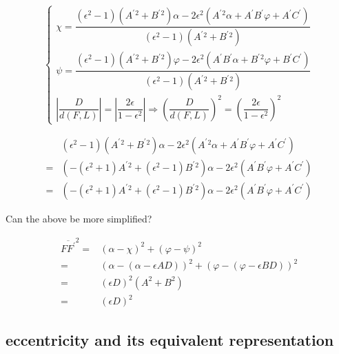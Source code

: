 \documentclass[
]{book}
\theoremstyle{definition}
\theoremstyle{definition}
\theoremstyle{definition}
\theoremstyle{definition}
\theoremstyle{remark}
\begin{document}
\[
\begin{cases}
\chi=\dfrac{\left(\epsilon^{2}-1\right)\left(A^{\prime}{}^{2}+B^{\prime}{}^{2}\right)\alpha-2\epsilon^{2}\left(A^{\prime}{}^{2}\alpha+A^{\prime}B^{\prime}\varphi+A^{\prime}C^{\prime}\right)}{\left(\epsilon^{2}-1\right)\left(A^{\prime}{}^{2}+B^{\prime}{}^{2}\right)}\\
\psi=\dfrac{\left(\epsilon^{2}-1\right)\left(A^{\prime}{}^{2}+B^{\prime}{}^{2}\right)\varphi-2\epsilon^{2}\left(A^{\prime}B^{\prime}\alpha+B^{\prime}{}^{2}\varphi+B^{\prime}C^{\prime}\right)}{\left(\epsilon^{2}-1\right)\left(A^{\prime}{}^{2}+B^{\prime}{}^{2}\right)}\\
\left|\dfrac{D}{d\left(F,L\right)}\right|=\left|\dfrac{2\epsilon}{1-\epsilon^{2}}\right|\Rightarrow\left(\dfrac{D}{d\left(F,L\right)}\right)^{2}=\left(\dfrac{2\epsilon}{1-\epsilon^{2}}\right)^{2}
\end{cases}
\]

\[
\begin{aligned}
 & \left(\epsilon^{2}-1\right)\left(A^{\prime}{}^{2}+B^{\prime}{}^{2}\right)\alpha-2\epsilon^{2}\left(A^{\prime}{}^{2}\alpha+A^{\prime}B^{\prime}\varphi+A^{\prime}C^{\prime}\right)\\
= & \left(-\left(\epsilon^{2}+1\right)A^{\prime}{}^{2}+\left(\epsilon^{2}-1\right)B^{\prime}{}^{2}\right)\alpha-2\epsilon^{2}\left(A^{\prime}B^{\prime}\varphi+A^{\prime}C^{\prime}\right)\\
= & \left(-\left(\epsilon^{2}+1\right)A^{\prime}{}^{2}+\left(\epsilon^{2}-1\right)B^{\prime}{}^{2}\right)\alpha-2\epsilon^{2}\left(A^{\prime}B^{\prime}\varphi+A^{\prime}C^{\prime}\right)
\end{aligned}
\]

Can the above be more simplified?

\[
\begin{aligned}
\overline{FF^{\prime}}^{2}= & \left(\alpha-\chi\right)^{2}+\left(\varphi-\psi\right)^{2}\\
= & \left(\alpha-\left(\alpha-\epsilon AD\right)\right)^{2}+\left(\varphi-\left(\varphi-\epsilon BD\right)\right)^{2}\\
= & \left(\epsilon D\right)^{2}\left(A^{2}+B^{2}\right)\\
= & \left(\epsilon D\right)^{2}
\end{aligned}
\]

\hypertarget{eccentricity-and-its-equivalent-representation}{%
\subsection{eccentricity and its equivalent representation}\label{eccentricity-and-its-equivalent-representation}}
\end{document}
